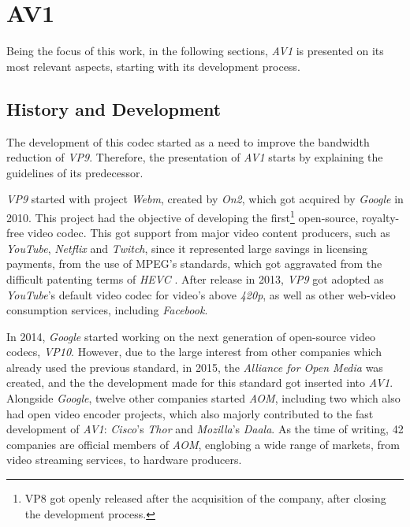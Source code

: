 \nocite{agostiniDesenvolvimentoArquiteturasAlto2007}

\section{AV1}

Being the focus of this work, in the following sections, \emph{AV1} is presented on its most relevant aspects, starting with its development process.

\subsection{History and Development}

\nocite{debarghamukherjeeAllThingsRTC2019Opening2019}

The development of this codec started as a need to improve the bandwidth reduction of \emph{VP9}. Therefore, the presentation of \emph{AV1} starts by explaining the guidelines of its predecessor.

\emph{VP9} started with project \emph{Webm}, created by \emph{On2}, which got acquired by \emph{Google} in 2010. This project had the objective of developing the first\footnote{VP8 got openly released after the acquisition of the company, after closing the development process.} open-source, royalty-free video codec. This got support from major video content producers, such as \emph{YouTube}, \emph{Netflix} and \emph{Twitch}, since it represented large savings in licensing payments, from the use of MPEG's standards, which got aggravated from the difficult patenting terms of \emph{HEVC} \cite{streamingmediaHEVCAdvancePatent2015}. After release in 2013, \emph{VP9} got adopted as \emph{YouTube}'s default video codec for video's above \emph{420p}, as well as other web-video consumption services, including \emph{Facebook}.

In 2014, \emph{Google} started working on the next generation of open-source video codecs, \emph{VP10}. However, due to the large interest from other companies which already used the previous standard, in 2015, the \emph{Alliance for Open Media} was created, and the the development made for this standard got inserted into \emph{AV1}. Alongside \emph{Google}, twelve other companies started \emph{AOM}, including two which also had open video encoder projects, which also majorly contributed to the fast development of \emph{AV1}: \emph{Cisco}'s \emph{Thor} and \emph{Mozilla}'s \emph{Daala}. As the time of writing, 42 companies are official members of \emph{AOM}, englobing a wide range of markets, from video streaming services, to hardware producers.

